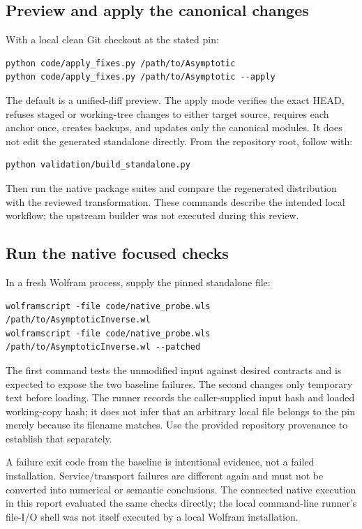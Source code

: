 \documentclass[11pt,a4paper]{article}
\begin{document}
\subsection{Preview and apply the canonical changes}
With a local clean Git checkout at the stated pin:
\begin{lstlisting}
python code/apply_fixes.py /path/to/Asymptotic
python code/apply_fixes.py /path/to/Asymptotic --apply
\end{lstlisting}
The default is a unified-diff preview. The apply mode verifies the exact HEAD, refuses staged or working-tree changes to either target source, requires each anchor once, creates backups, and updates only the canonical modules. It does not edit the generated standalone directly. From the repository root, follow with:
\begin{lstlisting}
python validation/build_standalone.py
\end{lstlisting}
Then run the native package suites and compare the regenerated distribution with the reviewed transformation. These commands describe the intended local workflow; the upstream builder was not executed during this review.

\subsection{Run the native focused checks}
In a fresh Wolfram process, supply the pinned standalone file:
\begin{lstlisting}
wolframscript -file code/native_probe.wls /path/to/AsymptoticInverse.wl
wolframscript -file code/native_probe.wls /path/to/AsymptoticInverse.wl --patched
\end{lstlisting}
The first command tests the unmodified input against desired contracts and is expected to expose the two baseline failures. The second changes only temporary text before loading. The runner records the caller-supplied input hash and loaded working-copy hash; it does not infer that an arbitrary local file belongs to the pin merely because its filename matches. Use the provided repository provenance to establish that separately.

A failure exit code from the baseline is intentional evidence, not a failed installation. Service/transport failures are different again and must not be converted into numerical or semantic conclusions. The connected native execution in this report evaluated the same checks directly; the local command-line runner's file-I/O shell was not itself executed by a local Wolfram installation.
\end{document}
